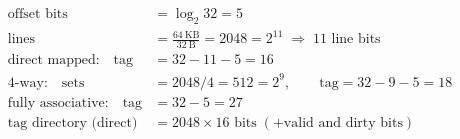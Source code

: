 \begin{formulas}
\begin{align*}
\text{offset bits} &= \log_2 32 = 5\\
\text{lines} &= \frac{64\ \text{KB}}{32\ \text{B}} = 2048 = 2^{11} \;\Rightarrow\; 11 \text{ line bits}\\
\text{direct mapped:}\quad \text{tag} &= 32 - 11 - 5 = 16\\
\text{4-way:}\quad \text{sets} &= 2048/4 = 512 = 2^9,\qquad \text{tag} = 32 - 9 - 5 = 18\\
\text{fully associative:}\quad \text{tag} &= 32 - 5 = 27\\
\text{tag directory (direct)} &= 2048 \times 16 \text{ bits} \;(+\text{valid and dirty bits})
\end{align*}
\end{formulas}

